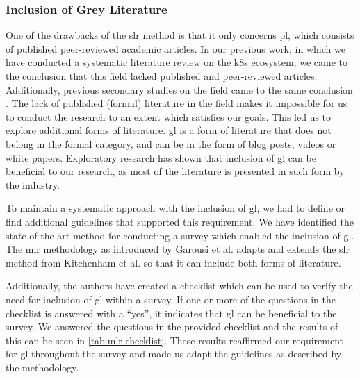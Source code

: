 \subsubsection{Inclusion of Grey Literature}
\label{sec:survey:methodology:strategy:gl}

One of the drawbacks of the \gls{slr} method is that it only concerns \gls{pl}, which consists of published peer-reviewed academic articles. In our previous work, in which we have conducted a systematic literature review on the \gls{k8s} ecosystem, we came to the conclusion that this field lacked published and peer-reviewed articles. Additionally, previous secondary studies on the field came to the same conclusion \cite{service-mesh-survey}. The lack of published (formal) literature in the field makes it impossible for us to conduct the research to an extent which satisfies our goals. This led us to explore additional forms of literature. \Gls{gl} is a form of literature that does not belong in the formal category, and can be in the form of blog posts, videos or white papers. Exploratory research has shown that inclusion of \gls{gl} can be beneficial to our research, as most of the literature is presented in such form by the industry.

To maintain a systematic approach with the inclusion of \gls{gl}, we had to define or find additional guidelines that supported this requirement. We have identified the state-of-the-art method for conducting a survey which enabled the inclusion of \gls{gl}. The \gls{mlr} methodology as introduced by Garousi et al. \cite{Garousi2019} adapts and extends the \gls{slr} method from Kitchenham et al. so that it can include both forms of literature. 



Additionally, the authors have created a checklist which can be used to verify the need for inclusion of \gls{gl} within a survey. If one or more of the questions in the checklist is answered with a “yes”, it indicates that \gls{gl} can be beneficial to the survey. We answered the questions in the provided checklist and the results of this can be seen in \cref{tab:mlr-checklist}. These results reaffirmed our requirement for \gls{gl} throughout the survey and made us adapt the guidelines as described by the methodology.




